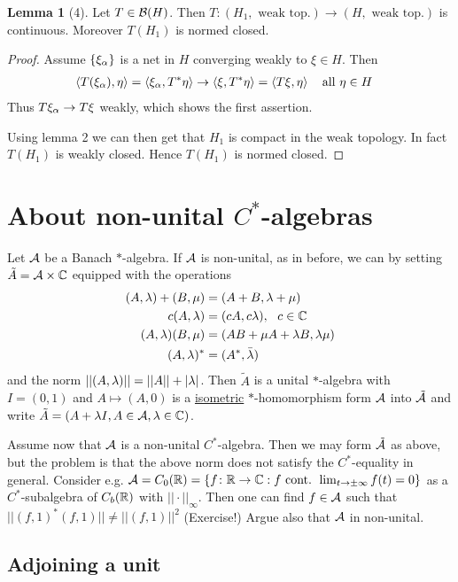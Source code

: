 \documentclass[10pt,english,a4paper]{article}
\theoremstyle{definition}
\newtheorem*{lemma}{Lemma}
\begin{document}
\begin{lemma}[4]
    Let $T \in \mathcal{B}(H)$. Then $T \colon (H_1 ,\text{ weak top.}) \to (H, \text{ weak top.})$
is continuous. Moreover $T(H_1)$ is normed closed.
\end{lemma}
\begin{proof}
    Assume $\{\xi_{\alpha}\}$ is a net in $H$ converging weakly to $\xi \in H$.
    Then
    \begin{align*}
        \left\langle T(\xi_{\alpha}),\eta \right\rangle &= \left\langle \xi_{\alpha}, T^*\eta \right\rangle \to
        \left\langle \xi,T^*\eta \right\rangle= \left\langle T\xi,\eta \right\rangle ~~\text{ all } \eta\in H 
    \end{align*}
    Thus $T\xi_{\alpha} \to T\xi$ weakly, which shows the first assertion.

    Using lemma 2 we can then get that $H_1$ is compact in the weak topology. 
    In fact $T(H_1)$ is weakly closed. Hence $T(H_1)$ is normed closed.  
\end{proof}


\section{About non-unital $C^*$-algebras}
Let $\mathcal{A}$ be a Banach $*$-algebra. If $\mathcal{A}$ is non-unital, as in before, we can 
 by setting $\tilde{A} = \mathcal{A}\times\mathbb{C}$ equipped 
with the operations 
\begin{align*}
    (A,\lambda) + (B,\mu) &= (A+B, \lambda+\mu) \\
    c(A,\lambda) &= (cA,c\lambda), ~~c \in \mathbb{C} \\
    (A,\lambda)(B,\mu) &= (AB + \mu A + \lambda B, \lambda\mu) \\
    (A,\lambda)^* &= (A^*, \bar{\lambda})
\end{align*}
and the norm $||(A,\lambda)|| = ||A|| + |\lambda|$.
Then $\tilde{A}$ is a unital $*$-algebra with $I = (0,1)$ and 
$A\mapsto (A,0)$ is a \ul{isometric} $*$-homomorphism form $\mathcal{A}$ into $\tilde{\mathcal{A}}$ 
and write $\tilde{A} = (A + \lambda I, A \in \mathcal{A}, \lambda \in \mathbb{C})$.

Assume now that $\mathcal{A}$ is a non-unital $C^*$-algebra. Then we may form $\tilde{\mathcal{A}}$
as above, but the problem is that the above norm does not satisfy the $C^*$-equality
in general. Consider e.g. $\mathcal{A} = C_{0}(\mathbb{R}) = \{f \colon \mathbb{R} \to \mathbb{C} : f \text{
cont. } \lim_{t\to\pm\infty}f(t) =0\}$ as a $C^*$-subalgebra of $C_b(\mathbb{R})$ with
$||\cdot||_{\infty}$.
Then one can find $f \in \mathcal{A}$ such that $||(f,1)^*(f,1)|| \neq ||(f,1)||^2$ (Exercise!)
Argue also that $\mathcal{A}$ in non-unital.

\subsection{Adjoining a unit}
\end{document}
